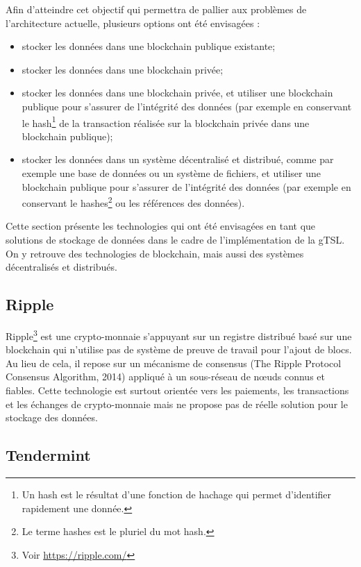 \documentclass{tnreport}
\begin{document}
Afin d'atteindre cet objectif qui permettra de pallier aux problèmes de l'architecture actuelle, plusieurs options ont été envisagées :
\begin{itemize}
	\item stocker les données dans une blockchain publique existante;
	\item stocker les données dans une blockchain privée;
	\item stocker les données dans une blockchain privée, et utiliser une blockchain publique pour s'assurer de l'intégrité des données (par exemple en conservant le hash\footnote{Un hash est le résultat d'une fonction de hachage qui permet d'identifier rapidement une donnée.} de la transaction réalisée sur la blockchain privée dans une blockchain publique);
	\item stocker les données dans un système décentralisé et distribué, comme par exemple une base de données ou un système de fichiers, et utiliser une blockchain publique pour s'assurer de l'intégrité des données (par exemple en conservant le hashes\footnote{Le terme hashes est le pluriel du mot hash.} ou les références des données).
	\newline
\end{itemize}

Cette section présente les technologies qui ont été envisagées en tant que solutions de stockage de données dans le cadre de l'implémentation de la gTSL. On y retrouve des technologies de blockchain, mais aussi des systèmes décentralisés et distribués.

\subsection{Ripple}

Ripple\footnote{Voir \url{https://ripple.com/}} est une crypto-monnaie s'appuyant sur un registre distribué basé sur une blockchain qui n'utilise pas de système de preuve de travail pour l'ajout de blocs. Au lieu de cela, il repose sur un mécanisme de consensus (The Ripple Protocol Consensus Algorithm, 2014) appliqué à un sous-réseau de nœuds connus et fiables. Cette technologie est surtout orientée vers les paiements, les transactions et les échanges de crypto-monnaie mais ne propose pas de réelle solution pour le stockage des données.

\subsection{Tendermint}
\end{document}
